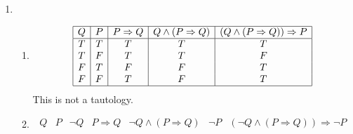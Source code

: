 \documentclass{article}
\providecommand{\implies}{}
\renewcommand{\implies}{\Rightarrow}
\newcommand{\twowayimplies}{\Leftrightarrow}
\theoremstyle{remark}
\begin{document}
\begin{enumerate}
\begin{enumerate}
\begin{enumerate}
\begin{proof}
        We have already shown above that there exists an $n$ which is both even and a difference of two perfect squares.
        Therefore, it cannot be true that for all even integers $n$ that $n$ is not the difference of two perfect squares.
      \end{proof}
    \item
      $\forall n.\ \neg E(n) \implies D(n)$.
      This statement is true.
      \begin{proof}
        In part a we proved that every odd integer could be written as the difference of two perfect squares.
        Therefore, the fact that $n$ is odd does imply that $n$ is the difference of two perfect squares.
      \end{proof}
    \item
      $\forall n.\ \neg E(n) \twowayimplies D(n)$.
      This statement is false.
      \begin{proof}
        To prove this statement we must prove both that $\neg E(n) \implies D(n)$ (which we just proved above) and that $D(n) \implies \neg E(n)$.
        This second implication cannot be true because as we have proven above there do exist even integers which are differences of two perfect squares.
      \end{proof}
    \end{enumerate}
  \end{enumerate}
\item
  \begin{enumerate}
  \item
    \begin{displaymath}
      \begin{array}{|c|c|c|c|c|c|}
        \hline
        Q & P & P \implies Q & Q \land (P \implies Q) & (Q \land (P \implies Q)) \implies P\\
        \hline
        T & T & T & T & T\\
        T & F & T & T & F\\
        F & T & F & F & T\\
        F & F & T & F & T\\
        \hline
      \end{array}
    \end{displaymath}
    This is not a tautology.
  \item
    \begin{displaymath}
      \begin{array}{|c|c|c|c|c|c|c|c|}
        \hline
        Q & P & \neg Q & P \implies Q & \neg Q \land (P \implies Q) & \neg P & (\neg Q \land (P \implies Q)) \implies \neg P\\

\end{array}
\end{displaymath}
\end{enumerate}
\end{enumerate}
\end{document}
